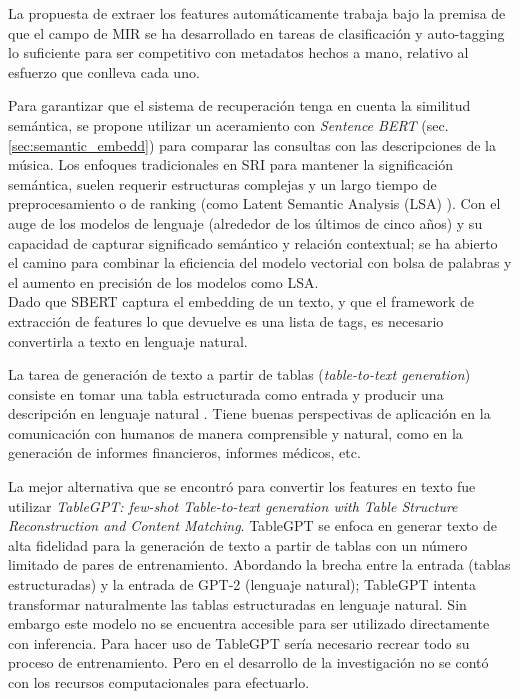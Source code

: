 La propuesta de extraer los features automáticamente trabaja bajo la premisa de que el campo de MIR se ha desarrollado en tareas de clasificación y auto-tagging lo suficiente para ser competitivo con metadatos hechos a mano, relativo al esfuerzo que conlleva cada uno. %

Para garantizar que el sistema de recuperación tenga en cuenta la similitud semántica, se propone utilizar un aceramiento con \textit{Sentence BERT} (sec. \ref{sec:semantic_embedd}) para comparar las consultas con las descripciones de la música. Los enfoques tradicionales en SRI para mantener la significación semántica, suelen requerir estructuras complejas y un largo tiempo de preprocesamiento o de ranking (como Latent Semantic Analysis (LSA) \cite{Foltz1996LatentSA}). Con el auge de los modelos de lenguaje (alrededor de los últimos de cinco años) y su capacidad de capturar significado semántico y relación contextual; se ha abierto el camino para combinar la eficiencia del modelo vectorial con bolsa de palabras y el aumento en precisión de los modelos como LSA. \\

Dado que SBERT captura el embedding de un texto, y que el framework de extracción de features lo que devuelve es una lista de tags, es necesario convertirla a texto en lenguaje natural.  

La tarea de generación de texto a partir de tablas (\textit{table-to-text generation}) consiste en tomar una tabla estructurada como entrada y producir una descripción en lenguaje natural \cite{Yang2021TableTT}. Tiene buenas perspectivas de aplicación en la comunicación con humanos de manera comprensible y natural, como en la generación de informes financieros, informes médicos, etc. 

La mejor alternativa que se encontró para convertir los features en texto fue utilizar \textit{TableGPT: few-shot Table-to-text generation with Table Structure Reconstruction and Content Matching}. TableGPT \cite{Gong2020TableGPTFT} se enfoca en generar texto de alta fidelidad para la generación de texto a partir de tablas con un número limitado de pares de entrenamiento. Abordando la brecha entre la entrada (tablas estructuradas) y la entrada de GPT-2 (lenguaje natural); TableGPT intenta transformar naturalmente las tablas estructuradas en lenguaje natural. Sin embargo este modelo no se encuentra accesible para ser utilizado directamente con inferencia. Para hacer uso de TableGPT sería necesario recrear todo su proceso de entrenamiento. Pero en el desarrollo de la investigación no se contó con los recursos computacionales para efectuarlo.

